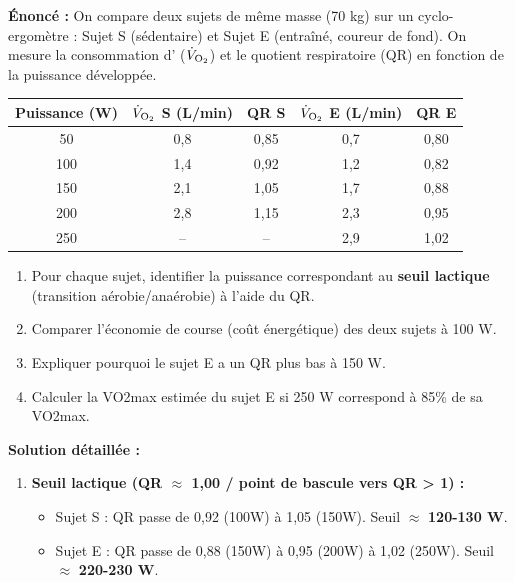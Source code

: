 \documentclass[11pt]{article}
\begin{document}
\begin{exoresolu}
    \textbf{Énoncé :} On compare deux sujets de même masse (70 kg) sur un cyclo-ergomètre : Sujet S (sédentaire) et Sujet E (entraîné, coureur de fond). On mesure la consommation d' ($\dot{V}_{\ce{O2}}$) et le quotient respiratoire (QR) en fonction de la puissance développée.
    \begin{center}
        \begin{tabular}{|c|c|c|c|c|}\hline
        Puissance (W) & $\dot{V}_{\ce{O2}}$ S (L/min) & QR S & $\dot{V}_{\ce{O2}}$ E (L/min) & QR E \\ \hline
        50 & 0,8 & 0,85 & 0,7 & 0,80 \\ \hline
        100 & 1,4 & 0,92 & 1,2 & 0,82 \\ \hline
        150 & 2,1 & 1,05 & 1,7 & 0,88 \\ \hline
        200 & 2,8 & 1,15 & 2,3 & 0,95 \\ \hline
        250 & -- & -- & 2,9 & 1,02 \\ \hline
    \end{tabular}
    \end{center}
    \begin{enumerate}
        \item Pour chaque sujet, identifier la puissance correspondant au \textbf{seuil lactique} (transition aérobie/anaérobie) à l'aide du QR.
        \item Comparer l'économie de course (coût énergétique) des deux sujets à 100 W.
        \item Expliquer pourquoi le sujet E a un QR plus bas à 150 W.
        \item Calculer la VO2max estimée du sujet E si 250 W correspond à 85\% de sa VO2max.
    \end{enumerate}
    \tcblower
    \textbf{Solution détaillée :}
    \begin{enumerate}
        \item \textbf{Seuil lactique (QR $\approx$ 1,00 / point de bascule vers QR > 1) :}
              \begin{itemize}
                  \item Sujet S : QR passe de 0,92 (100W) à 1,05 (150W). Seuil $\approx$ \textbf{120-130 W}.
                  \item Sujet E : QR passe de 0,88 (150W) à 0,95 (200W) à 1,02 (250W). Seuil $\approx$ \textbf{220-230 W}.
              \end{itemize}

\end{enumerate}
\end{exoresolu}
\end{document}
